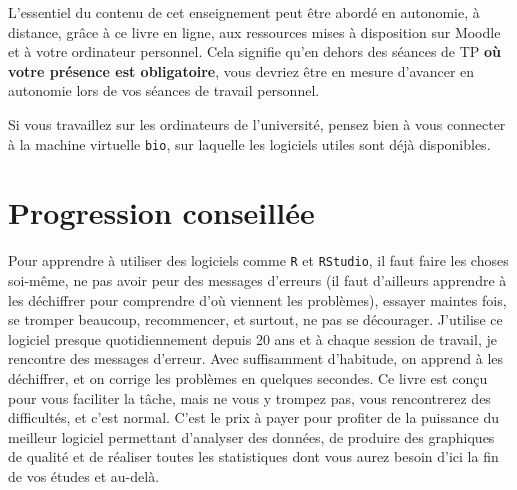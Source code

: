 \documentclass[
  a4paper,
  DIV=11,
  numbers=noendperiod,
  oneside]{scrreprt}
\begin{document}
\begin{tcolorbox}[enhanced jigsaw, coltitle=black, toprule=.15mm, opacityback=0, breakable, colback=white, opacitybacktitle=0.6, colframe=quarto-callout-important-color-frame, leftrule=.75mm, rightrule=.15mm, titlerule=0mm, bottomtitle=1mm, toptitle=1mm, arc=.35mm, title=\textcolor{quarto-callout-important-color}{\faExclamation}\hspace{0.5em}{Important}, colbacktitle=quarto-callout-important-color!10!white, bottomrule=.15mm, left=2mm]

L'essentiel du contenu de cet enseignement peut être abordé en
autonomie, à distance, grâce à ce livre en ligne, aux ressources mises à
disposition sur Moodle et à votre ordinateur personnel. Cela signifie
qu'en dehors des séances de TP \textbf{où votre présence est
obligatoire}, vous devriez être en mesure d'avancer en autonomie lors de
vos séances de travail personnel.

\end{tcolorbox}

Si vous travaillez sur les ordinateurs de l'université, pensez bien à
vous connecter à la machine virtuelle \texttt{bio}, sur laquelle les
logiciels utiles sont déjà disponibles.

\section*{Progression conseillée}\label{progression-conseilluxe9e}


Pour apprendre à utiliser des logiciels comme \texttt{R} et
\texttt{RStudio}, il faut faire les choses soi-même, ne pas avoir peur
des messages d'erreurs (il faut d'ailleurs apprendre à les déchiffrer
pour comprendre d'où viennent les problèmes), essayer maintes fois, se
tromper beaucoup, recommencer, et surtout, ne pas se décourager.
J'utilise ce logiciel presque quotidiennement depuis 20 ans et à chaque
session de travail, je rencontre des messages d'erreur. Avec
suffisamment d'habitude, on apprend à les déchiffrer, et on corrige les
problèmes en quelques secondes. Ce livre est conçu pour vous faciliter
la tâche, mais ne vous y trompez pas, vous rencontrerez des difficultés,
et c'est normal. C'est le prix à payer pour profiter de la puissance du
meilleur logiciel permettant d'analyser des données, de produire des
graphiques de qualité et de réaliser toutes les statistiques dont vous
aurez besoin d'ici la fin de vos études et au-delà.
\end{document}
